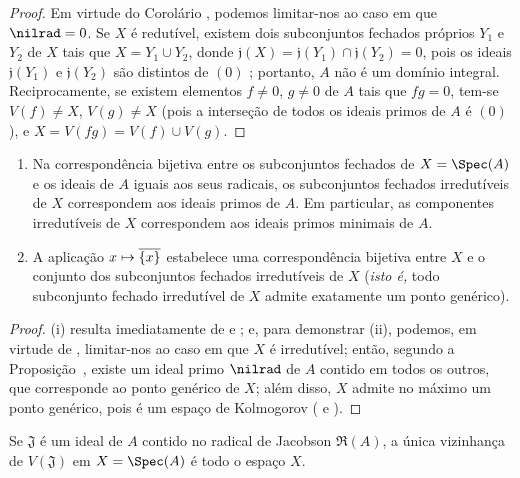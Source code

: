 \documentclass[oneside]{amsart}
\makeatletter
\newcommand{\ega@arrow}[2]{\mathchoice{#1}{#2}{#2}{#2}}
\let\ega@shortmapsto\mapsto
\renewcommand{\mapsto}{\ega@arrow{\longmapsto}{\ega@shortmapsto}}
\newcommand{\oldpage}[2][]{{\marginnote{\normalfont\textbf{#1}~|~#2}}\ignorespaces}
\let\EGAOriginalLabel\label
\renewcommand{\label}[1]{\phantomsection\EGAOriginalLabel{#1}}
\makeatother
\begin{document}
\begin{proof}
Em virtude do Corolário , podemos limitar-nos ao caso em que $\nilrad=0$.
Se $X$ é redutível, existem dois subconjuntos fechados próprios $Y_1$ e $Y_2$ de $X$ tais que $X=Y_1\cup Y_2$, donde $\mathfrak{j}(X)=\mathfrak{j}(Y_1)\cap\mathfrak{j}(Y_2)=0$, pois os ideais $\mathfrak{j}(Y_1)$ e $\mathfrak{j}(Y_2)$ são distintos de $(0)$ ;
portanto, $A$ não é um domínio integral.
Reciprocamente, se existem elementos $f\neq 0$, $g\neq 0$ de $A$ tais que $fg=0$, tem-se $V(f)\neq X$, $V(g)\neq X$ (pois a interseção de todos os ideais primos de $A$ é $(0)$), e $X=V(fg)=V(f)\cup V(g)$.
\end{proof}

\begin{corollary}[1.1.14]
\label{I.1.1.14}
\medskip\noindent
\begin{enumerate}
  \item[{\rm(i)}] Na correspondência bijetiva entre os subconjuntos fechados de $X=\Spec(A)$ e os ideais de $A$ iguais aos seus radicais, os subconjuntos fechados irredutíveis de $X$ correspondem aos ideais primos de $A$.
    Em particular, as componentes irredutíveis de $X$ correspondem aos ideais primos minimais de $A$.
  \item[{\rm(ii)}] A aplicação $x\mapsto\overline{\{x\}}$ estabelece uma correspondência bijetiva entre $X$ e o conjunto dos subconjuntos fechados irredutíveis de $X$ (\emph{isto é,} todo subconjunto fechado irredutível de $X$ admite exatamente um ponto genérico).
\end{enumerate}
\end{corollary}

\begin{proof}
(i) resulta imediatamente de  e ;
e, para demonstrar (ii), podemos, em virtude de , limitar-nos ao caso em que $X$ é irredutível;
então, segundo a Proposição~, existe um ideal primo $\nilrad$ de $A$ contido em todos os outros, que corresponde ao ponto genérico
\oldpage[I]{83}
de $X$;
além disso, $X$ admite no máximo um ponto genérico, pois é um espaço de Kolmogorov ( e ).
\end{proof}

\begin{proposition}[1.1.15]
\label{I.1.1.15}
Se $\mathfrak{J}$ é um ideal de $A$ contido no radical de Jacobson $\mathfrak{R}(A)$, a única
vizinhança de $V(\mathfrak{J})$ em $X=\Spec(A)$ é todo o espaço $X$.
\end{proposition}
\end{document}

